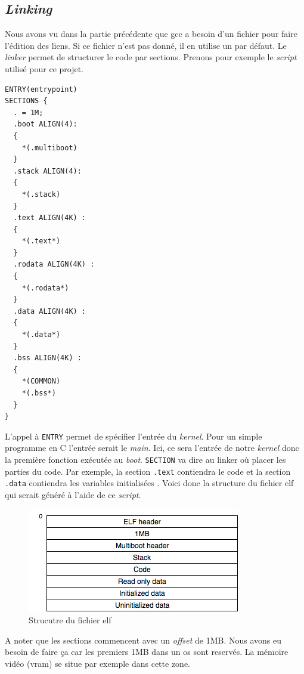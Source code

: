 \documentclass[a4paper]{article}
\begin{document}

\subsection{\textit{Linking}}
Nous avons vu dans la partie précédente que \acrshort{gcc} a besoin d'un fichier
pour faire l'édition des liens. Si ce fichier n'est pas donné, il en utilise un par
défaut. Le \textit{linker} permet de structurer le code par sections. Prenons
pour exemple le \textit{script} utilisé pour ce projet.

\begin{verbatim}
ENTRY(entrypoint)
SECTIONS {
  . = 1M;
  .boot ALIGN(4):
  {
    *(.multiboot)
  }
  .stack ALIGN(4):
  {
    *(.stack)
  }
  .text ALIGN(4K) :
  {
    *(.text*)
  }
  .rodata ALIGN(4K) :
  {
    *(.rodata*)
  }
  .data ALIGN(4K) :
  {
    *(.data*)
  }
  .bss ALIGN(4K) :
  {
    *(COMMON)
    *(.bss*)
  }
}
\end{verbatim}


L'appel à \texttt{ENTRY} permet de spécifier l'entrée du \textit{kernel}.
Pour un simple programme en C l'entrée serait le \textit{main}. Ici, ce sera
l'entrée de notre \textit{kernel} donc la première fonction exécutée au \textit{boot}.
\texttt{SECTION} va dire au linker où placer les parties du code. Par exemple, 
la section \texttt{.text} contiendra le code et la section \texttt{.data}
contiendra les variables initialisées \cite{ref9,ref10,ref11}. Voici donc la structure
du fichier \acrshort{elf} qui serait généré à l'aide de ce \textit{script}.

\begin{figure}[!h]
  \centering
  \includegraphics[scale=0.75]{images/elf_struct.png}
  \caption{Strucutre du fichier \acrshort{elf}}
\end{figure}

A noter que les sections commencent avec un \textit{offset} de 1MB. Nous avons eu
besoin de faire ça car les premiers 1MB dans un \acrshort{os} sont reservés. La 
mémoire vidéo (\acrshort{vram}) se situe par exemple dans cette zone.
\end{document}
